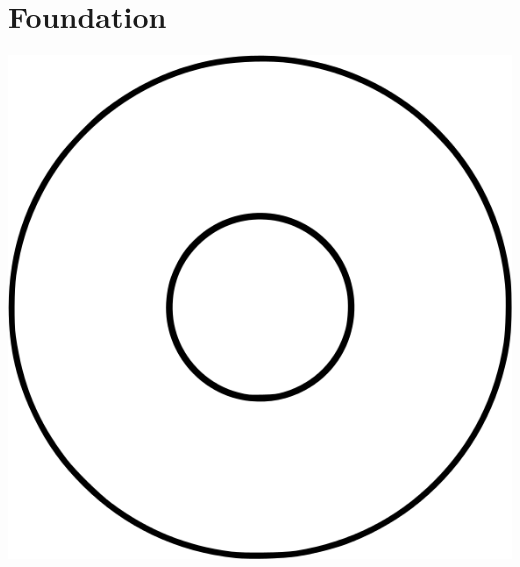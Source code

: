 \documentclass[CSHFoundation.tex]{subfiles}
\begin{document}
\chapter{Foundation}
\centerline{\includegraphics[scale=0.35]{6-Flogo.png}}
%
\end{document}
